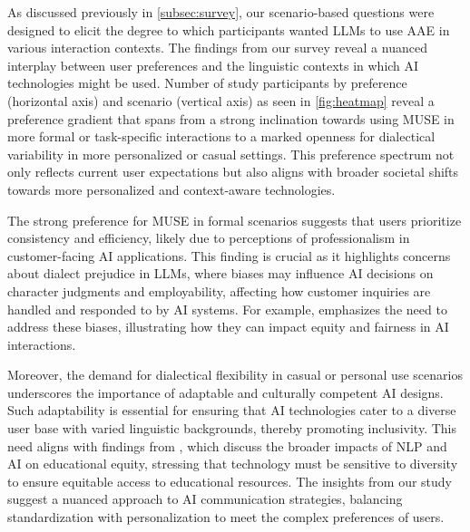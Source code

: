 As discussed previously in \autoref{subsec:survey}, our scenario-based questions were designed to elicit the degree to which participants wanted LLMs to use AAE in various interaction contexts. The findings from our survey reveal a nuanced interplay between user preferences and the linguistic contexts in which AI technologies might be used. Number of study participants by preference (horizontal axis) and scenario (vertical axis) as seen in  \autoref{fig:heatmap} reveal a preference gradient that spans from a strong inclination towards using MUSE in more formal or task-specific interactions to a marked openness for dialectical variability in more personalized or casual settings. This preference spectrum not only reflects current user expectations but also aligns with broader societal shifts towards more personalized and context-aware technologies.

The strong preference for MUSE in formal scenarios suggests that users prioritize consistency and efficiency, likely due to perceptions of professionalism in customer-facing AI applications. This finding is crucial as it highlights concerns about dialect prejudice in LLMs, where biases may influence AI decisions on character judgments and employability, affecting how customer inquiries are handled and responded to by AI systems. For example, \citet{hofmann2024dialect} emphasizes the need to address these biases, illustrating how they can impact equity and fairness in AI interactions.


Moreover, the demand for dialectical flexibility in casual or personal use scenarios underscores the importance of adaptable and culturally competent AI designs. Such adaptability is essential for ensuring that AI technologies cater to a diverse user base with varied linguistic backgrounds, thereby promoting inclusivity. This need aligns with findings from \citet{mayfield-etal-2019-equity}, which discuss the broader impacts of NLP and AI on educational equity, stressing that technology must be sensitive to diversity to ensure equitable access to educational resources. The insights from our study suggest a nuanced approach to AI communication strategies, balancing standardization with personalization to meet the complex preferences of users.



